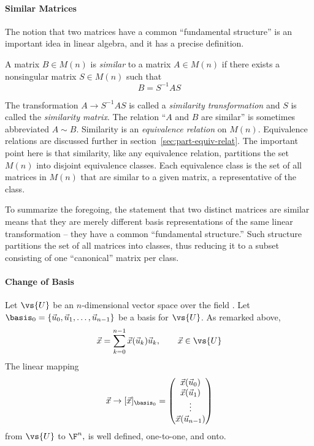 \paragraph{Similar Matrices}
The notion that two matrices have a common ``fundamental
structure'' is an important idea in linear algebra, and it has a
precise definition.
\begin{definition}
A matrix $B \in M(n)$ is {\it similar} to a matrix $A \in M(n)$ if
there exists a nonsingular matrix $S\in M(n)$ such that 
\[B = S^{-1} A S\]
\end{definition}
The transformation $A \to S^{-1} A S$ is called a {\it
similarity transformation} and $S$ is called the {\it similarity matrix}.  
The relation ``$A$ and $B$ are similar'' is sometimes abbreviated $A \sim
B$.  Similarity is an {\it equivalence relation} on $M(n)$.
Equivalence relations are discussed further in
section~\ref{sec:part-equiv-relat}.  The important 
point here is that similarity, like any equivalence relation,
partitions the set $M(n)$ into disjoint equivalence classes.  Each
equivalence class is the set of all matrices in $M(n)$ that are similar
to a given matrix, a representative of the class.  

To summarize the foregoing, the statement that two distinct matrices
are similar means that they are merely different basis
representations of the same linear transformation -- they have a
common ``fundamental structure.''  Such structure 
partitions the set of all matrices into classes,
thus reducing it to a subset consisting of one ``canonical''
matrix per class.  

\paragraph{Change of Basis}
Let $\vs{U}$ be an $n$-dimensional vector space over the field \F.  Let
$\basis_0 = \{\vec{u}_0, \vec{u}_1, \ldots, \vec{u}_{n-1}\}$ be a basis for $\vs{U}$.  
As remarked above,
\[
\vec{x} = \sum_{k=0}^{n-1} \vec{x}(\vec{u}_k) \vec{u}_k, \qquad \vec{x} \in \vs{U}
\]
The linear mapping
\[
\vec{x} \to [\vec{x}]_{\basis_0} =
\begin{pmatrix}
\vec{x}(\vec{u}_0) \\ \vec{x}(\vec{u}_1) \\ \vdots \\ \vec{x}(\vec{u}_{n-1})
\end{pmatrix}
\]
from $\vs{U}$ to $\F^n,$ is well defined, one-to-one, and onto.  

